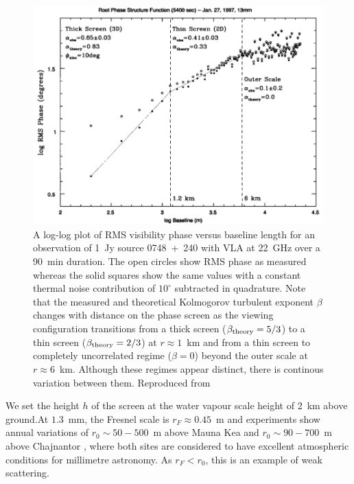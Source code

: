 \begin{figure}
\begin{center}
\includegraphics[width=\columnwidth]{Images/screentransition}
\caption{A log-log plot of RMS visibility phase versus baseline length for an observation of 1~Jy source 0748~+~240 with VLA at 22~GHz over a 90~min duration. The open circles show RMS phase as measured whereas the solid squares show the same values with a constant thermal noise contribution of $10^\circ$ subtracted in quadrature. Note that the measured and theoretical Kolmogorov turbulent exponent $\beta$ changes with distance on the phase screen as the viewing configuration transitions from a thick screen ($\beta_{\rm theory} = 5/3$) to a thin screen ($\beta_{\rm theory} = 2/3$) at $r \approx 1$~km and from a thin screen to completely uncorrelated regime ($\beta = 0$) beyond the outer scale at $r \approx 6$~km. Although these regimes appear distinct, there is continous variation between them. Reproduced from \citet*{Carilli_1997} \label{fig:screentransition}
}
\end{center}
\end{figure}

 We set the height $h$ of the screen at the water vapour scale height of 2~km above ground.At $1.3$~mm, the Fresnel scale is $r_F \approx 0.45$~m and experiments show annual variations of $r_0 \sim 50 - 500$~m above Mauna Kea \citep{Masson_1994} and $r_0 \sim 90 - 700$~m above Chajnantor \citep*{Radford_1998}, where both sites are considered to have excellent atmospheric conditions for millimetre astronomy. As $r_F < r_0$, this is an example of weak scattering. 



